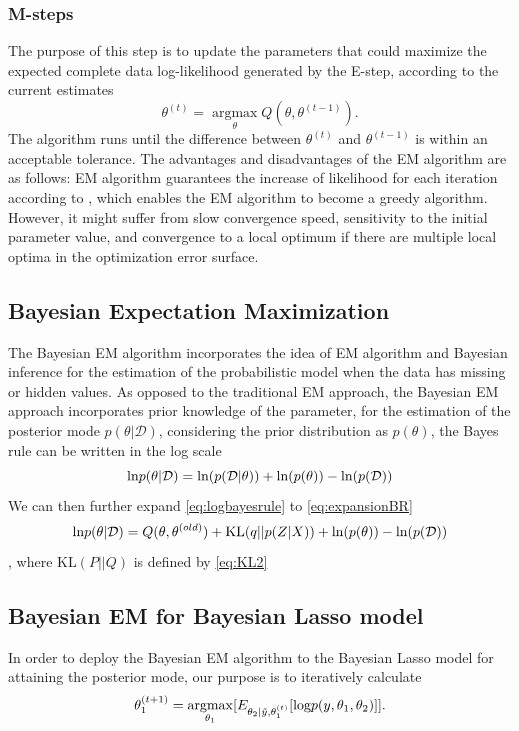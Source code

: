 \subsubsection{M-steps}
The purpose of this step is to update the parameters that could maximize the expected complete data log-likelihood generated by the E-step, according to the current estimates
\begin{equation}
	\theta^{(t)} = 
	\operatorname*{argmax}_{\theta} Q(\theta,\theta^{(t-1)}).
\end{equation}
The algorithm runs until the difference between $\theta^{(t)}$ and $\theta^{(t-1)}$ is within an acceptable tolerance. 
The advantages and disadvantages of the EM algorithm are as follows: EM algorithm guarantees the increase of likelihood for each iteration according to \cite{EM}, which enables the EM algorithm to become a greedy algorithm. However, it might suffer from slow convergence speed, sensitivity to the initial parameter value, and convergence to a local optimum if there are multiple local optima in the optimization error surface.


\subsection{Bayesian Expectation Maximization}
The Bayesian EM algorithm incorporates the idea of EM algorithm and Bayesian inference for the estimation of the probabilistic model when the data has missing or hidden values. As opposed to the traditional EM approach, the Bayesian EM approach incorporates prior knowledge of the parameter, for the estimation of the posterior mode $p(\theta|\mathcal{D})$, considering the prior distribution as $p(\theta)$, the Bayes rule can be written in the log scale
\begin{equation}
	\label{eq:logbayesrule}
	\textnormal{ln} p(\theta|\mathcal{D}) = \textnormal{ln}(p(\mathcal{D}|\theta)) + \textnormal{ln}(p(\theta)) - \textnormal{ln}(p(\mathcal{D}))
\end{equation}
We can then further expand \autoref{eq:logbayesrule} to \autoref{eq:expansionBR}
\begin{equation}
	\label{eq:expansionBR}
	\textnormal{ln} p(\theta|\mathcal{D}) = Q(\theta,\theta^{(old)}) + \textnormal{KL}(q||p(Z|X)) + \textnormal{ln}(p(\theta)) - \textnormal{ln}(p(\mathcal{D}))
\end{equation}
, where KL$(P||Q)$ is defined by \autoref{eq:KL2}

\subsection{Bayesian EM for Bayesian Lasso model}
In order to deploy the Bayesian EM algorithm to the Bayesian Lasso model for attaining the posterior mode, our purpose is to iteratively calculate 
\begin{equation}
	\theta_1^{(t+1)} = \operatorname*{argmax}_{\theta_1} [E_{\theta_2|\tilde{y},\theta_1^{(t)}}[\textnormal{log}p(y,\theta_1,\theta_2)]].
\end{equation}

